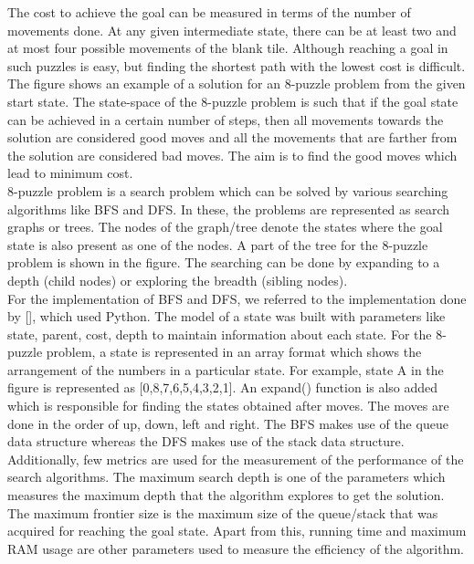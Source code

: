 \documentclass{svproc}
\begin{document}
The cost to achieve the goal can be measured in terms of the number of movements done. At any given intermediate state, there can be at least two and at most four possible movements of the blank tile. Although reaching a goal in such puzzles is easy, but finding the shortest path with the lowest cost is difficult. The figure shows an example of a solution for an 8-puzzle problem from the given start state. The state-space of the 8-puzzle problem is such that if the goal state can be achieved in a certain number of steps, then all movements towards the solution are considered good moves and all the movements that are farther from the solution are considered bad moves. The aim is to find the good moves which lead to minimum cost. \\
8-puzzle problem is a search problem which can be solved by various searching algorithms like BFS and DFS. In these, the problems are represented as search graphs or trees. The nodes of the graph/tree denote the states where the goal state is also present as one of the nodes. A part of the tree for the 8-puzzle problem is shown in the figure. The searching can be done by expanding to a depth (child nodes) or exploring the breadth (sibling nodes). \\
For the implementation of BFS and DFS, we referred to the implementation done by [], which used Python. The model of a state was built with parameters like state, parent, cost, depth to maintain information about each state. For the 8-puzzle problem, a state is represented in an array format which shows the arrangement of the numbers in a particular state. For example, state A in the figure is represented as [0,8,7,6,5,4,3,2,1]. An expand() function is also added which is responsible for finding the states obtained after moves. The moves are done in the order of up, down, left and right. The BFS makes use of the queue data structure whereas the DFS makes use of the stack data structure. \\
Additionally, few metrics are used for the measurement of the performance of the search algorithms. The maximum search depth is one of the parameters which measures the maximum depth that the algorithm explores to get the solution. The maximum frontier size is the maximum size of the queue/stack that was acquired for reaching the goal state. Apart from this, running time and maximum RAM usage are other parameters used to measure the efficiency of the algorithm. \\
\end{document}
